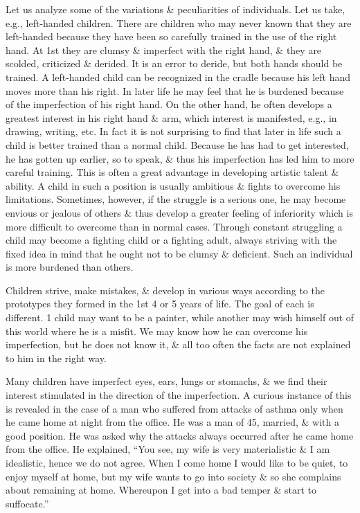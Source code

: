 \documentclass{article}
\begin{document}
Let us analyze some of the variations \& peculiarities of individuals. Let us take, e.g., left-handed children. There are children who may never known that they are left-handed because they have been so carefully trained in the use of the right hand. At 1st they are clumsy \& imperfect with the right hand, \& they are scolded, criticized \& derided. It is an error to deride, but both hands should be trained. A left-handed child can be recognized in the cradle because his left hand moves more than his right. In later life he may feel that he is burdened because of the imperfection of his right hand. On the other hand, he often develops a greatest interest in his right hand \& arm, which interest is manifested, e.g., in drawing, writing, etc. In fact it is not surprising to find that later in life such a child is better trained than a normal child. Because he has had to get interested, he has gotten up earlier, so to speak, \& thus his imperfection has led him to more careful training. This is often a great advantage in developing artistic talent \& ability. A child in such a position is usually ambitious \& fights to overcome his limitations. Sometimes, however, if the struggle is a serious one, he may become envious or jealous of others \& thus develop a greater feeling of inferiority which is more difficult to overcome than in normal cases. Through constant struggling a child may become a fighting child or a fighting adult, always striving with the fixed idea in mind that he ought not to be clumsy \& deficient. Such an individual is more burdened than others.

Children strive, make mistakes, \& develop in various ways according to the prototypes they formed in the 1st 4 or 5 years of life. The goal of each is different. 1 child may want to be a painter, while another may wish himself out of this world where he is a misfit. We may know how he can overcome his imperfection, but he does not know it, \& all too often the facts are not explained to him in the right way.

Many children have imperfect eyes, ears, lungs or stomachs, \& we find their interest stimulated in the direction of the imperfection. A curious instance of this is revealed in the case of a man who suffered from attacks of asthma only when he came home at night from the office. He was a man of 45, married, \& with a good position. He was asked why the attacks always occurred after he came home from the office. He explained, ``You see, my wife is very materialistic \& I am idealistic, hence we do not agree. When I come home I would like to be quiet, to enjoy myself at home, but my wife wants to go into society \& so she complains about remaining at home. Whereupon I get into a bad temper \& start to suffocate.''
\end{document}
